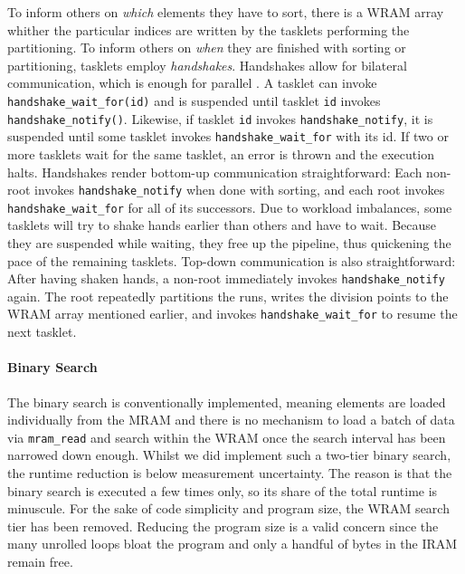 To inform others on \emph{which} elements they have to sort, there is a WRAM array whither the particular indices are written by the tasklets performing the partitioning.
To inform others on \emph{when} they are finished with sorting or partitioning, tasklets employ \emph{handshakes}.
Handshakes allow for bilateral communication, which is enough for parallel \MS{}.
A tasklet can invoke \lstinline|handshake_wait_for(id)| and is suspended until tasklet \lstinline|id| invokes \lstinline|handshake_notify()|.
Likewise, if tasklet \lstinline|id| invokes \lstinline|handshake_notify|, it is suspended until some tasklet invokes \lstinline|handshake_wait_for| with its id.
If two or more tasklets wait for the same tasklet, an error is thrown and the execution halts.
Handshakes render bottom-up communication straightforward:
Each non-root invokes \lstinline|handshake_notify| when done with sorting, and each root invokes \lstinline|handshake_wait_for| for all of its successors.
Due to workload imbalances, some tasklets will try to shake hands earlier than others and have to wait.
Because they are suspended while waiting, they free up the pipeline, thus quickening the pace of the remaining tasklets.
Top-down communication is also straightforward:
After having shaken hands, a non-root immediately invokes \lstinline|handshake_notify| again.
The root repeatedly partitions the runs, writes the division points to the WRAM array mentioned earlier, and invokes \lstinline|handshake_wait_for| to resume the next tasklet.


\paragraph{Binary Search}
The binary search is conventionally implemented, meaning elements are loaded individually from the MRAM and there is no mechanism to load a batch of data via \lstinline|mram_read| and search within the WRAM once the search interval has been narrowed down enough.
Whilst we did implement such a two-tier binary search, the runtime reduction is below measurement uncertainty.
The reason is that the binary search is executed a few times only, so its share of the total runtime is minuscule.
For the sake of code simplicity and program size, the WRAM search tier has been removed.
Reducing the program size is a valid concern since the many unrolled loops bloat the program and only a handful of bytes in the IRAM remain free.

